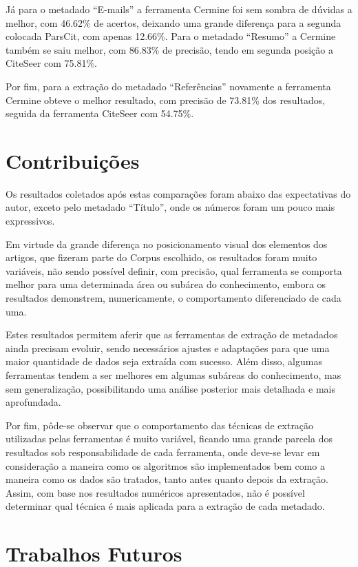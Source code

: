 Já para o metadado ``E-mails'' a ferramenta Cermine foi sem sombra de dúvidas a melhor, com 46.62\% de acertos, deixando uma grande diferença para a segunda colocada ParsCit, com apenas 12.66\%. Para o metadado ``Resumo'' a Cermine também se saiu melhor, com 86.83\% de precisão, tendo em segunda posição a CiteSeer com 75.81\%.

Por fim, para a extração do metadado ``Referências'' novamente a ferramenta Cermine obteve o melhor resultado, com precisão de 73.81\% dos resultados, seguida da ferramenta CiteSeer com 54.75\%.

\section{Contribuições}
\label{sec:contributions}

Os resultados coletados após estas comparações foram abaixo das expectativas do autor, exceto pelo metadado ``Título'', onde os números foram um pouco mais expressivos.

Em virtude da grande diferença no posicionamento visual dos elementos dos artigos, que fizeram parte do Corpus escolhido, os resultados foram muito variáveis, não sendo possível definir, com precisão, qual ferramenta se comporta melhor para uma determinada área ou subárea do conhecimento, embora os resultados demonstrem, numericamente, o comportamento diferenciado de cada uma.

Estes resultados permitem aferir que as ferramentas de extração de metadados ainda precisam evoluir, sendo necessários ajustes e adaptações para que uma maior quantidade de dados seja extraída com sucesso. Além disso, algumas ferramentas tendem a ser melhores em algumas subáreas do conhecimento, mas sem generalização, possibilitando uma análise posterior mais detalhada e mais aprofundada.

Por fim, pôde-se observar que o comportamento das técnicas de extração utilizadas pelas ferramentas é muito variável, ficando uma grande parcela dos resultados sob responsabilidade de cada ferramenta, onde deve-se levar em consideração a maneira como os algoritmos são implementados bem como a maneira como os dados são tratados, tanto antes quanto depois da extração. Assim, com base nos resultados numéricos apresentados, não é possível determinar qual técnica é mais aplicada para a extração de cada metadado.

\section{Trabalhos Futuros}
\label{sec:future-work}

